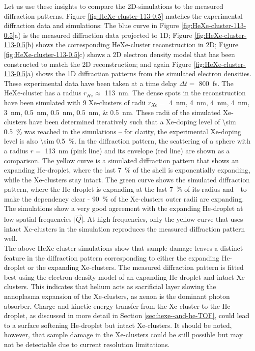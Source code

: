 Let us use these insights to compare the 2D-simulations to the measured diffraction patterns. Figure \ref{fig:HeXe-cluster-113-0.5} matches the experimental diffraction data and simulations: The blue curve in Figure \ref{fig:HeXe-cluster-113-0.5}a) is the measured diffraction data projected to 1D; Figure \ref{fig:HeXe-cluster-113-0.5}b) shows the corresponding HeXe-cluster reconstruction in 2D; Figure \ref{fig:HeXe-cluster-113-0.5}c) shows a 2D electron density model that has been constructed to match the 2D reconstruction; and again Figure \ref{fig:HeXe-cluster-113-0.5}a) shows the 1D diffraction patterns from the simulated electron densities. These experimental data have been taken at a time delay $\Delta t=$ \SI{800}{\femto\second}. The HeXe-cluster has a radius $r_{He}\approx$ \SI{113}{\nano\meter}. The dense spots in the reconstruction have been simulated with \num{9} Xe-clusters of radii $r_{Xe}=$ \SIlist{4;4;4;4;3;0.5;0.5;0.5;0.5}{\nano\meter}. These radii of the simulated Xe-clusters have been determined iteratively such that a Xe-doping level of \SI{\sim 0.5}{\percent} was reached in the simulations -- for clarity, the experimental Xe-doping level is also \SI{\sim 0.5}{\percent}. In the diffraction pattern, the scattering of a sphere with a radius $r=$ \SI{113}{\nano\meter} (pink line) and its envelope (red line) are shown as a comparison. The yellow curve is a simulated diffraction pattern that shows an expanding He-droplet, where the last \SI{7}{\percent} of the shell is exponentially expanding, while the Xe-clusters stay intact. The green curve shows the simulated diffraction pattern, where the He-droplet is expanding at the last \SI{7}{\percent} of its radius and - to make the dependency clear - \SI{90}{\percent} of the Xe-clusters outer radii are expanding. The simulations show a very good agreement with the expanding He-droplet at low spatial-frequencies $\lvert\vec{Q}\rvert$. At high frequencies, only the yellow curve that uses intact Xe-clusters in the simulation reproduces the measured diffraction pattern well.\\[1\baselineskip]
%
The above HeXe-cluster simulations show that sample damage leaves a distinct feature in the diffraction pattern corresponding to either the expanding He-droplet or the expanding Xe-clusters. The measured diffraction pattern is fitted best using the electron density model of an expanding He-droplet and intact Xe-clusters. This indicates that helium acts as sacrificial layer slowing the nanoplasma expansion of the Xe-clusters, as xenon is the dominant photon absorber. Charge and kinetic energy transfer \cite{Hau-Riege-2007-PRL,Hoener-2008-JPB} from the Xe-cluster to the He-droplet, as discussed in more detail in Section \ref{sec:hexe--and-he-TOF}, could lead to a surface softening He-droplet but intact Xe-clusters. It should be noted, however, that sample damage in the Xe-clusters could be still possible but may not be detectable due to current resolution limitations.

